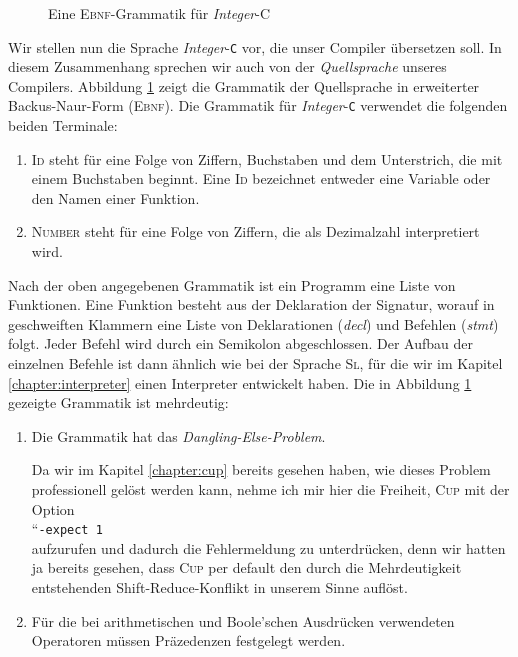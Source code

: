 \begin{figure}[!ht]
\begin{center}
\begin{minipage}[t]{12.5cm}
  \end{minipage}
  \end{center}
  \caption{Eine \textsc{Ebnf}-Grammatik f\"ur \textsl{Integer}-\textsc{C}}
\label{fig:compiler.cup}
\end{figure}

\noindent
Wir stellen nun die Sprache \textsl{Integer}-\texttt{C} vor, die unser Compiler \"ubersetzen
soll.  In diesem Zusammenhang sprechen wir auch von der \emph{Quellsprache} unseres Compilers.
Abbildung \ref{fig:compiler.cup} zeigt die Grammatik der Quellsprache in 
erweiterter Backus-Naur-Form (\textsc{Ebnf}). 
Die Grammatik f\"ur \textsl{Integer}-\texttt{C} verwendet die folgenden beiden Terminale:
\begin{enumerate}
\item \textsc{Id} steht f\"ur eine Folge von Ziffern, Buchstaben und dem Unterstrich, die 
      mit einem Buchstaben beginnt.  Eine \textsc{Id} bezeichnet entweder eine Variable oder
      den Namen einer Funktion.
\item \textsc{Number} steht f\"ur eine Folge von Ziffern, die als Dezimalzahl interpretiert wird.
\end{enumerate}
Nach der oben angegebenen Grammatik ist ein Programm eine Liste von Funktionen.
Eine Funktion besteht aus der Deklaration der Signatur, worauf in geschweiften Klammern
eine Liste von Deklarationen (\textsl{decl}) und Befehlen (\textsl{stmt}) folgt.  Jeder Befehl wird
durch ein Semikolon abgeschlossen.  Der Aufbau der einzelnen Befehle ist dann
\"ahnlich wie bei der Sprache \textsc{Sl}, f\"ur die wir im Kapitel \ref{chapter:interpreter}
einen Interpreter entwickelt haben.
Die in Abbildung \ref{fig:compiler.cup} gezeigte Grammatik ist mehrdeutig:
\begin{enumerate}
\item Die Grammatik hat das \emph{Dangling-Else-Problem}.

      Da wir im Kapitel \ref{chapter:cup} bereits gesehen haben, wie dieses Problem
      professionell gel\"ost werden kann, nehme ich mir hier die Freiheit, \textsc{Cup} mit der Option
      \\[0.2cm]
      \hspace*{1.3cm}
      ``\texttt{-expect 1}
      \\[0.2cm]
      aufzurufen und dadurch die Fehlermeldung zu unterdr\"ucken, denn wir hatten ja bereits gesehen, dass
      \textsc{Cup} per default den durch die Mehrdeutigkeit entstehenden Shift-Reduce-Konflikt in unserem
      Sinne aufl\"ost. 
\item F\"ur die bei arithmetischen und Boole'schen Ausdr\"ucken verwendeten Operatoren
      m\"ussen Pr\"azedenzen festgelegt werden.
\end{enumerate}

